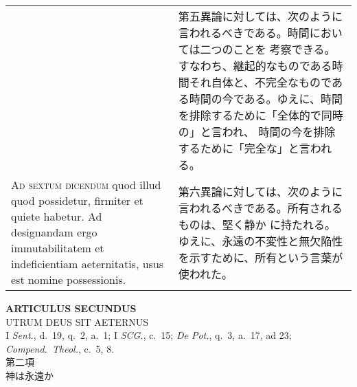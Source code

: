 \documentclass[10pt]{jsarticle} %
\begin{document}
\begin{longtable}{p{21em}p{21em}}
&

第五異論に対しては、次のように言われるべきである。時間においては二つのことを
考察できる。すなわち、継起的なものである時間それ自体と、不完全なものであ
る時間の今である。ゆえに、時間を排除するために「全体的で同時の」と言われ、
時間の今を排除するために「完全な」と言われる。


\\

{\scshape Ad sextum dicendum} quod illud quod possidetur, firmiter et
quiete habetur. Ad designandam ergo immutabilitatem et indeficientiam
aeternitatis, usus est nomine possessionis.

&


第六異論に対しては、次のように言われるべきである。所有されるものは、堅く静か
に持たれる。ゆえに、永遠の不変性と無欠陥性を示すために、所有という言葉が
使われた。

\end{longtable}


\newpage
{}

\begin{center}
 {\Large {\bf ARTICULUS SECUNDUS}}\\
 {\large UTRUM DEUS SIT AETERNUS}\\
 {\footnotesize I {\itshape Sent.}, d.~19, q.~2, a.~1; I {\itshape
 SCG.}, c.~15; {\itshape De Pot.}, q.~3, a.~17, ad 23; {\itshape
 Compend.~Theol.}, c.~5, 8.}\\
 {\Large 第二項\\神は永遠か}
\end{center}
\end{document}
